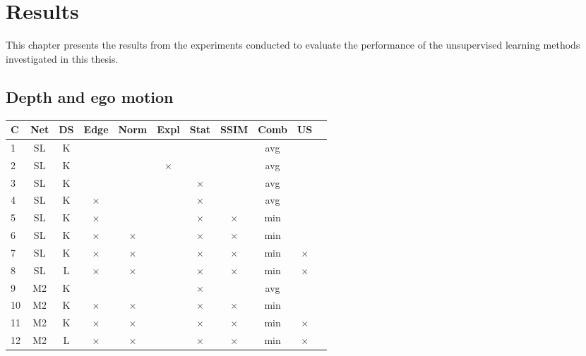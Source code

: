 \chapter{Results}\label{cha:results}

This chapter presents the results from the experiments conducted to evaluate the performance of the unsupervised learning methods investigated in this thesis. 

\section{Depth and ego motion}

\begin{table}[H]
\centering
\begin{tabular}{|l|c|c||c|c||c|c||c|c|c|c|}
\hline
C & Net & DS & Edge & Norm & Expl & Stat & SSIM & Comb & US \\
\hline
1 & SL & K &  &  &  &  &  & avg &  \\
\hline
2 & SL & K &  &  & $ \times $ &  &  & avg &  \\
\hline
3 & SL & K &  &  &  & $ \times $ &  & avg &  \\
\hline
4 & SL & K & $ \times $ &  &  & $ \times $ &  & avg &  \\
\hline
5 & SL & K & $ \times $ &  &  & $ \times $ & $ \times $ & min &  \\
\hline
6 & SL & K & $ \times $ & $ \times $ &  & $ \times $ & $ \times $ & min &  \\
\hline
7 & SL & K & $ \times $ & $ \times $ &  & $ \times $ & $ \times $ & min & $ \times $ \\
\hline
8 & SL & L & $ \times $ & $ \times $ &  & $ \times $ & $ \times $ & min & $ \times $ \\
\hline
9 & M2 & K &  &  &  & $ \times $ &  & avg &  \\
\hline
10 & M2 & K & $ \times $ & $ \times $ &  & $ \times $ & $ \times $ & min &  \\
\hline
11 & M2 & K & $ \times $ & $ \times $ &  & $ \times $ & $ \times $ & min & $ \times $ \\
\hline
12 & M2 & L & $ \times $ & $ \times $ &  & $ \times $ & $ \times $ & min & $ \times $ \\
\hline
\end{tabular}

\end{table}
